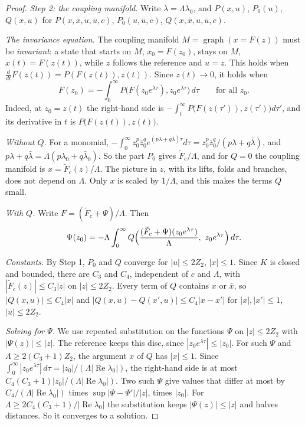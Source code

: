 \documentclass[11pt,reqno]{amsart}
\theoremstyle{plain}
\theoremstyle{definition}
\theoremstyle{remark}
\DeclareMathOperator{\graph}{graph}
\begin{document}
\begin{proof}
\emph{Step 2: the coupling manifold.} Write $\lambda=\Lambda\lambda_0$, and $P(x,u)$, $P_0(u)$, $Q(x,u)$ for $P(x,\bar x,u,\bar u,c)$, $P_0(u,\bar u,c)$, $Q(x,\bar x,u,\bar u,c)$.

\emph{The invariance equation.} The coupling manifold $M=\graph(x=F(z))$ must be \emph{invariant}: a state that starts on $M$, $x_0=F(z_0)$, stays on $M$, $x(t)=F(z(t))$, while $z$ follows the reference and $u=z$. This holds when $\frac{d}{dt}F(z(t))=P(F(z(t)),z(t))$. Since $z(t)\to0$, it holds when
\[
  F(z_0)=-\int_0^\infty P\bigl(F(z_0e^{\lambda\tau}),z_0e^{\lambda\tau}\bigr)\,d\tau\qquad\text{for all }z_0.
\]
Indeed, at $z_0=z(t)$ the right-hand side is $-\int_t^\infty P\bigl(F(z(\tau')),z(\tau')\bigr)d\tau'$, and its derivative in $t$ is $P\bigl(F(z(t)),z(t)\bigr)$.

\emph{Without $Q$.} For a monomial, $-\int_0^\infty z_0^{p}\bar z_0^{q}e^{(p\lambda+q\bar\lambda)\tau}d\tau=z_0^{p}\bar z_0^{q}/(p\lambda+q\bar\lambda)$, and $p\lambda+q\bar\lambda=\Lambda(p\lambda_0+q\bar\lambda_0)$. So the part $P_0$ gives $\tilde F_c/\Lambda$, and for $Q=0$ the coupling manifold is $x=\tilde F_c(z)/\Lambda$. The picture in $z$, with its lifts, folds and branches, does not depend on $\Lambda$. Only $x$ is scaled by $1/\Lambda$, and this makes the terms $Q$ small.

\emph{With $Q$.} Write $F=(\tilde F_c+\Psi)/\Lambda$. Then
\[
  \Psi(z_0)=-\Lambda\int_0^\infty Q\Bigl(\frac{(\tilde F_c+\Psi)(z_0e^{\lambda\tau})}{\Lambda},\ z_0e^{\lambda\tau}\Bigr)\,d\tau .
\]

\emph{Constants.} By Step 1, $P_0$ and $Q$ converge for $|u|\le2Z_2$, $|x|\le1$. Since $K$ is closed and bounded, there are $C_3$ and $C_4$, independent of $c$ and $\Lambda$, with $|\tilde F_c(z)|\le C_3|z|$ on $|z|\le2Z_2$. Every term of $Q$ contains $x$ or $\bar x$, so $|Q(x,u)|\le C_4|x|$ and $|Q(x,u)-Q(x',u)|\le C_4|x-x'|$ for $|x|,|x'|\le1$, $|u|\le2Z_2$.

\emph{Solving for $\Psi$.} We use repeated substitution on the functions $\Psi$ on $|z|\le2Z_2$ with $|\Psi(z)|\le|z|$. The reference keeps this disc, since $|z_0e^{\lambda\tau}|\le|z_0|$. For such $\Psi$ and $\Lambda\ge2(C_3+1)Z_2$, the argument $x$ of $Q$ has $|x|\le1$. Since $\int_0^\infty|z_0e^{\lambda\tau}|\,d\tau=|z_0|/(\Lambda|\operatorname{Re}\lambda_0|)$, the right-hand side is at most $C_4(C_3+1)|z_0|/(\Lambda|\operatorname{Re}\lambda_0|)$. Two such $\Psi$ give values that differ at most by $C_4/(\Lambda|\operatorname{Re}\lambda_0|)$ times $\sup|\Psi-\Psi'|/|z|$, times $|z_0|$. For $\Lambda\ge2C_4(C_3+1)/|\operatorname{Re}\lambda_0|$ the substitution keeps $|\Psi(z)|\le|z|$ and halves distances. So it converges to a solution.


\end{proof}
\end{document}
